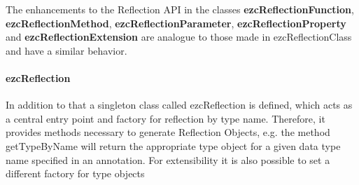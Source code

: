 \documentclass[10pt,final,a4paper,oneside]{article}
\begin{document}
The enhancements to the Reflection API
in the classes
\textbf{ezcReflectionFunction},
\textbf{ezcReflectionMethod},
\textbf{ezcReflectionParameter},
\textbf{ezcReflectionProperty} and
\textbf{ezcReflectionExtension}
are analogue to those made in
ezcReflectionClass
and have a similar behavior.

%
%
%
%


\paragraph{ezcReflection}
In addition to that a singleton class
called ezcReflection is defined,
which  acts as a central entry point
and factory for reflection by type name.
Therefore, it provides methods necessary
to generate Reflection Objects,
e.g. the method getTypeByName
will return the appropriate type object
for a given data type name specified in an annotation.
For extensibility it is also possible
to set a different factory for type objects
\end{document}
